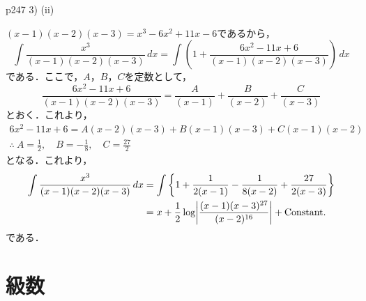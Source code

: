\documentclass[dvipdfmx,uplatex,11pt]{jsarticle}
\DeclarePairedDelimiter\abs{\lvert}{\rvert}
\theoremstyle{definition}
\begin{document}
p247 3) (ii)
\begin{leftbar}
    $(x-1)(x-2)(x-3)=x^3 -6x^2+11x-6$であるから，
    \[
        \int \frac{x^3}{(x-1)(x-2)(x-3)} \, dx  = \int \left (1+ \frac{6x^2-11x+6}{(x-1)(x-2)(x-3)}\right) \, dx
    \]
    である．ここで，$A$，$B$，$C$を定数として，
    \[
        \frac{6x^2-11x+6}{(x-1)(x-2)(x-3)} = \frac{A}{(x-1)}+\frac{B}{(x-2)}+\frac{C}{(x-3)}
    \]
    とおく．これより，
    \begin{gather*}
        6x^2-11x+6 = A(x-2)(x-3)+B (x-1)(x-3)+C(x-1)(x-2) \\
        \therefore ~ A = \frac{1}{2}, \quad B = -\frac{1}{8},\quad C= \frac{27}{2}
    \end{gather*}
    となる．これより，
    \begin{align*}
        \int \frac{x^3}{(x-1)(x-2)(x-3)} \, dx & = \int \left \{ 1+ \frac{1}{2(x-1)} - \frac{1}{8(x-2)}+\frac{27}{2(x-3)} \right \} \\
        & = x + \frac{1}{2} \log \abs*{\frac{(x-1)(x-3)^{27}}{(x-2)^{16}}}+\mathrm{Constant.}
    \end{align*}
    である．
\end{leftbar}

\newpage 

\section{級数}
\end{document}
